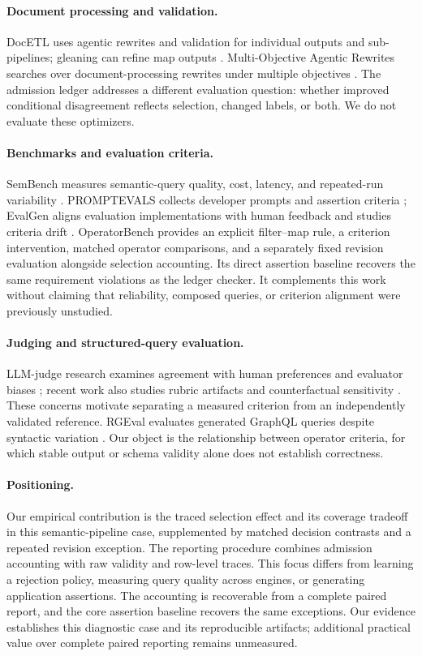 \documentclass[11pt]{article}
\begin{document}
\paragraph{Document processing and validation.}
DocETL uses agentic rewrites and validation for individual outputs and
sub-pipelines; gleaning can refine map outputs \cite{docetl}. Multi-Objective
Agentic Rewrites searches over document-processing rewrites under multiple
objectives \cite{moar}. The admission ledger addresses a different evaluation
question: whether improved conditional disagreement reflects selection,
changed labels, or both. We do not evaluate these optimizers.

\paragraph{Benchmarks and evaluation criteria.}
SemBench measures semantic-query quality, cost, latency, and repeated-run
variability \cite{sembench}. PROMPTEVALS collects developer prompts and
assertion criteria \cite{promptevals}; EvalGen aligns evaluation implementations
with human feedback and studies criteria drift \cite{evalgen}. OperatorBench
provides an explicit filter--map rule, a criterion intervention, matched
operator comparisons, and a separately fixed revision evaluation alongside
selection accounting. Its direct assertion baseline recovers the same
requirement violations as the ledger checker. It complements this
work without claiming that reliability, composed queries, or criterion
alignment were previously unstudied.

\paragraph{Judging and structured-query evaluation.}
LLM-judge research examines agreement with human preferences and evaluator
biases \cite{judge}; recent work also studies rubric artifacts and
counterfactual sensitivity \cite{rubric}. These concerns motivate separating
a measured criterion from an independently validated reference. RGEval
evaluates generated GraphQL queries despite syntactic variation \cite{rgeval}.
Our object is the relationship between operator criteria, for which stable
output or schema validity alone does not establish correctness.

\paragraph{Positioning.}
Our empirical contribution is the traced selection effect and its coverage
tradeoff in this semantic-pipeline case, supplemented by matched decision
contrasts and a repeated revision exception. The reporting procedure combines
admission accounting with raw validity and row-level traces. This focus differs
from learning a rejection policy, measuring query quality across engines, or
generating application assertions. The accounting is recoverable from a
complete paired report, and the core assertion baseline recovers the same
exceptions. Our evidence establishes this diagnostic case and its reproducible
artifacts; additional practical value over complete paired reporting remains
unmeasured.
\end{document}
